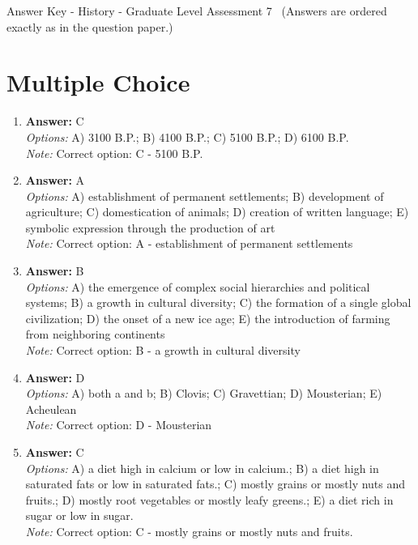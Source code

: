 \documentclass[12pt]{article}
\begin{document}
\begin{center}
Answer Key - History - Graduate Level Assessment 7 \
\small (Answers are ordered exactly as in the question paper.)
\end{center}

\section*{Multiple Choice}
\begin{enumerate}[label=\arabic*.]
\item \textbf{Answer:} C
\\ \textit{Options:} A) 3100 B.P.; B) 4100 B.P.; C) 5100 B.P.; D) 6100 B.P.
\\ \textit{Note:} Correct option: C - 5100 B.P.
\item \textbf{Answer:} A
\\ \textit{Options:} A) establishment of permanent settlements; B) development of agriculture; C) domestication of animals; D) creation of written language; E) symbolic expression through the production of art
\\ \textit{Note:} Correct option: A - establishment of permanent settlements
\item \textbf{Answer:} B
\\ \textit{Options:} A) the emergence of complex social hierarchies and political systems; B) a growth in cultural diversity; C) the formation of a single global civilization; D) the onset of a new ice age; E) the introduction of farming from neighboring continents
\\ \textit{Note:} Correct option: B - a growth in cultural diversity
\item \textbf{Answer:} D
\\ \textit{Options:} A) both a and b; B) Clovis; C) Gravettian; D) Mousterian; E) Acheulean
\\ \textit{Note:} Correct option: D - Mousterian
\item \textbf{Answer:} C
\\ \textit{Options:} A) a diet high in calcium or low in calcium.; B) a diet high in saturated fats or low in saturated fats.; C) mostly grains or mostly nuts and fruits.; D) mostly root vegetables or mostly leafy greens.; E) a diet rich in sugar or low in sugar.
\\ \textit{Note:} Correct option: C - mostly grains or mostly nuts and fruits.
\end{enumerate}
\end{document}
